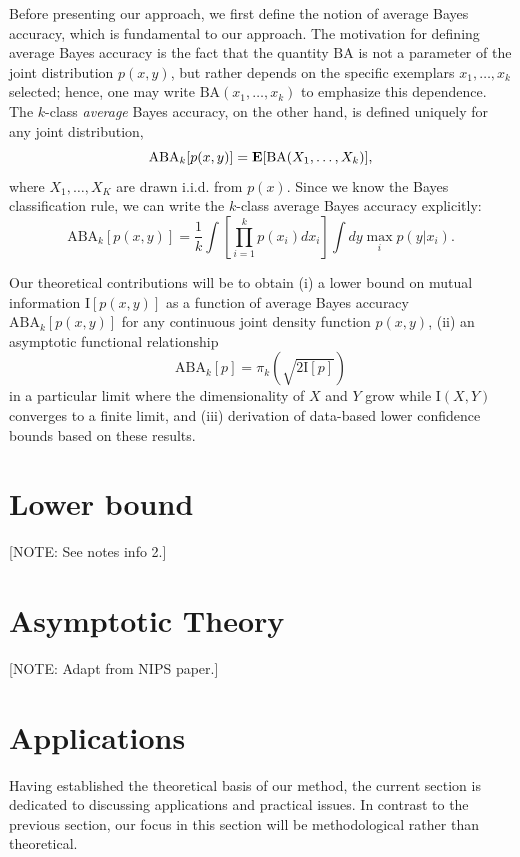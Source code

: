 \documentclass[12pt]{article}
\begin{document}
Before presenting our approach, we first define the notion of average
Bayes accuracy, which is fundamental to our approach.  The motivation for
defining average Bayes accuracy is the fact that the quantity $\text{BA}$
is not a parameter of the joint distribution $p(x, y)$, but rather
depends on the specific exemplars $x_1,\hdots, x_k$ selected; hence,
one may write $\text{BA}(x_1,\hdots, x_k)$ to emphasize this
dependence.  The $k$-class \emph{average} Bayes accuracy, on the other hand, is
defined uniquely for any joint distribution,
\begin{equation}\label{eq:abe}
\text{ABA}_k[p(x,y)] = \textbf{E}[\text{BA}(X_1,\hdots, X_k)],
\end{equation}
where $X_1,\hdots, X_K$ are drawn i.i.d. from $p(x)$.
Since we know the Bayes classification rule, we can write the $k$-class average Bayes accuracy explicitly:
\[
\text{ABA}_k[p(x,y)] = \frac{1}{k} \int \left[\prod_{i=1}^k p(x_i) dx_i \right] \int dy \max_i p(y|x_i).
\]

Our theoretical contributions will be to obtain (i) a lower bound on mutual information $\text{I}[p(x,y)]$ as a function of average Bayes accuracy $\text{ABA}_k[p(x,y)]$ for any continuous joint density function $p(x,y)$, (ii) an asymptotic functional relationship
\[
\text{ABA}_k[p] = \pi_k(\sqrt{2 \text{I}[p]})
\]
in a particular limit where the dimensionality of $X$ and $Y$ grow while $\text{I}(X,Y)$ converges to a finite limit,
and (iii) derivation of data-based lower confidence bounds based on these results.

\section{Lower bound}

[NOTE: See notes info 2.]

\section{Asymptotic Theory}

[NOTE: Adapt from NIPS paper.]

\section{Applications}

Having established the theoretical basis of our method, the current
section is dedicated to discussing applications and practical issues.
In contrast to the previous section, our focus in this section will be
methodological rather than theoretical.
\end{document}
